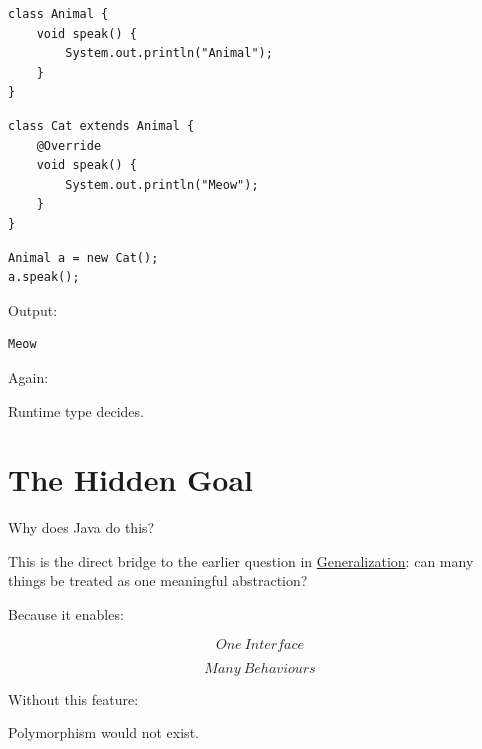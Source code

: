 \documentclass[11pt,a4paper]{book}
\begin{document}
\begin{verbatim}
class Animal {
    void speak() {
        System.out.println("Animal");
    }
}
\end{verbatim}


\begin{verbatim}
class Cat extends Animal {
    @Override
    void speak() {
        System.out.println("Meow");
    }
}
\end{verbatim}


\begin{verbatim}
Animal a = new Cat();
a.speak();
\end{verbatim}


Output:

\begin{verbatim}
Meow
\end{verbatim}


Again:

Runtime type decides.


\section{The Hidden Goal}

Why does Java do this?

This is the direct bridge to the earlier question in \hyperref[chap:generalization]{Generalization}: can many things be treated as one meaningful abstraction?


Because it enables:

\[
One\ Interface
\]

\[
Many\ Behaviours
\]


Without this feature:

\textcolor{RosettaDeepGreen}{Polymorphism} would not exist.

\end{document}
